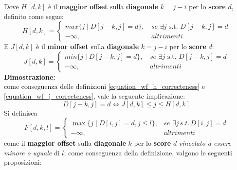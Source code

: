     Dove $H[d, k]$ è il \textbf{maggior offset} sulla \textbf{diagonale} $k = j - i$ per lo \textbf{score} $d$, definito come segue:
    \begin{equation}
        H[d, k] = \begin{cases}
            max\{j \mid D[j - k, j] = d\}, & \, se \, \, \exists j \text{ s.t. } D[j - k, j] = d \\
            - \infty, & \, altrimenti
        \end{cases}
    \label{equation_wf_h_correcteness}
    \end{equation}
    E $J[d, k]$ è il \textbf{minor offset} sulla \textbf{diagonale} $k = j - i$ per lo \textbf{score} $d$:
    \begin{equation}
        J[d, k] = \begin{cases}
            min\{j \mid D[j - k, j] = d\}, & \, se \, \, \exists j \text{ s.t. } D[j - k, j] = d \\
            - \infty, & \, altrimenti
        \end{cases}
    \label{equation_wf_j_correcteness}
    \end{equation}
    \textbf{Dimostrazione:} \\
    come conseguenza delle definizioni \ref{equation_wf_h_correcteness} e \ref{equation_wf_j_correcteness}, vale la seguente implicazione:
    \begin{equation}
        D[j - k, j] = d \iff J[d, k] \leq j \leq H[d, k]
        \label{equation:demonstration_property}
    \end{equation}
    Si definisca 
    \begin{equation}
        F[d, k, l] = \begin{cases}
            \max \{j \mid D[i, j] = d, j \leq l \}, & se \, \, \exists j \, s.t. \, D[i,j] = d \\
            - \infty, & altrimenti
        \end{cases}
    \end{equation}
    come il \textbf{maggior offset} sulla \textbf{diagonale} $k$ per lo \textbf{score} $d$ \emph{vincolato a essere minore o uguale} di $l$; come conseguenza della definizione, valgono le seguenti proposizioni:
    
